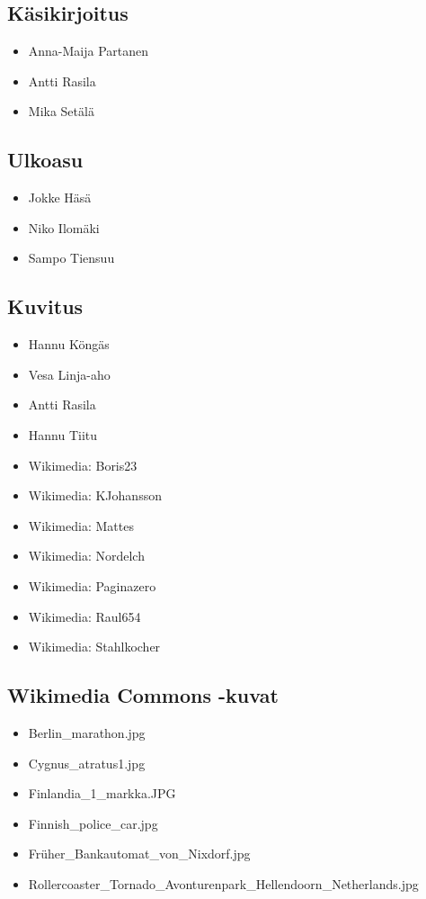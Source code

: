 \subsection*{Käsikirjoitus}
\begin{itemize}
\item Anna-Maija Partanen
\item Antti Rasila
\item Mika Setälä
\end{itemize}

\subsection*{Ulkoasu}
\begin{itemize}
\item Jokke Häsä
\item Niko Ilomäki
\item Sampo Tiensuu
\end{itemize}

\subsection*{Kuvitus}
\begin{itemize}
\item Hannu Köngäs
\item Vesa Linja-aho
\item Antti Rasila
\item Hannu Tiitu
\item Wikimedia: Boris23
\item Wikimedia: KJohansson
\item Wikimedia: Mattes
\item Wikimedia: Nordelch
\item Wikimedia: Paginazero
\item Wikimedia: Raul654
\item Wikimedia: Stahlkocher
\end{itemize}

\subsection*{Wikimedia Commons -kuvat}
\begin{itemize}
    \item {Berlin\_marathon.jpg}
    \item {Cygnus\_atratus1.jpg}
    \item {Finlandia\_1\_markka.JPG}
    \item {Finnish\_police\_car.jpg}
    \item {Früher\_Bankautomat\_von\_Nixdorf.jpg}
    \item {Rollercoaster\_Tornado\_Avonturenpark\_Hellendoorn\_Netherlands.jpg}
\end{itemize}
